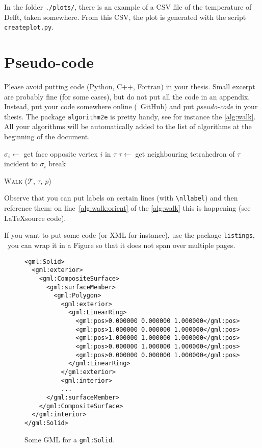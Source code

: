 In the folder \texttt{./plots/}, there is an example of a CSV file of the temperature of Delft, taken somewhere.
From this CSV, the plot is generated with the script \texttt{createplot.py}.


%
\section{Pseudo-code}%
\label{sec:code}

Please avoid putting code (Python, C++, Fortran) in your thesis.
Small excerpt are probably fine (for some cases), but do not put all the code in an appendix.
Instead, put your code somewhere online (\eg\ GitHub) and put \emph{pseudo-code} in your thesis.
The package \texttt{algorithm2e} is pretty handy, see for instance the \autoref{alg:walk}.
All your algorithms will be automatically added to the list of algorithms at the beginning of the document.
\begin{algorithm}
  \BlankLine
  {
    {
      $\sigma_i \leftarrow$ get face opposite vertex $i$ in $\tau$\;
      {
        $\tau \leftarrow$ get neighbouring tetrahedron of $\tau$ incident to $\sigma_i$\;
        break\;
      }
    }  
    {
    }
  }
  \caption[W\textsc{alk}]{W\textsc{alk} ($\mathcal{T}$, $\tau$, $p$)}%
\label{alg:walk}
\end{algorithm}
Observe that you can put labels on certain lines (with \texttt{\textbackslash nllabel{}}) and then reference  them: on line~\ref{alg:walk:orient} of the \autoref{alg:walk} this is happening (see \LaTeX source code).

If you want to put some code (or XML for instance), use the package \texttt{listings}, \eg\ you can wrap it in a Figure so that it does not span over multiple pages.
\begin{figure}
\begin{footnotesize}
\begin{lstlisting}
<gml:Solid>
  <gml:exterior>
    <gml:CompositeSurface>
      <gml:surfaceMember>
        <gml:Polygon>
          <gml:exterior>
            <gml:LinearRing>
              <gml:pos>0.000000 0.000000 1.000000</gml:pos>
              <gml:pos>1.000000 0.000000 1.000000</gml:pos>
              <gml:pos>1.000000 1.000000 1.000000</gml:pos>
              <gml:pos>0.000000 1.000000 1.000000</gml:pos>
              <gml:pos>0.000000 0.000000 1.000000</gml:pos>
            </gml:LinearRing>
          </gml:exterior>
          <gml:interior>
          ...
      </gml:surfaceMember>
    </gml:CompositeSurface>
  </gml:interior>
</gml:Solid>
\end{lstlisting}
\end{footnotesize}
\caption{Some GML for a \texttt{gml:Solid}.}%
\label{fig:codegml}
\end{figure}

